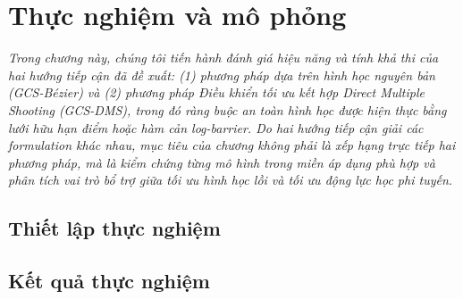 \chapter{Thực nghiệm và mô phỏng}
\label{ch:experiments}

\indent\textit{
Trong chương này, chúng tôi tiến hành đánh giá hiệu năng và tính khả thi của hai hướng tiếp cận đã đề xuất: (1) phương pháp dựa trên hình học nguyên bản (GCS-Bézier) và (2) phương pháp Điều khiển tối ưu kết hợp Direct Multiple Shooting (GCS-DMS), trong đó ràng buộc an toàn hình học được hiện thực bằng lưới hữu hạn điểm hoặc hàm cản log-barrier. Do hai hướng tiếp cận giải các formulation khác nhau, mục tiêu của chương không phải là xếp hạng trực tiếp hai phương pháp, mà là kiểm chứng từng mô hình trong miền áp dụng phù hợp và phân tích vai trò bổ trợ giữa tối ưu hình học lồi và tối ưu động lực học phi tuyến.
}

\section{Thiết lập thực nghiệm}
\label{sec:exp_setup}


\section{Kết quả thực nghiệm}
\label{sec:exp_results}


% 
